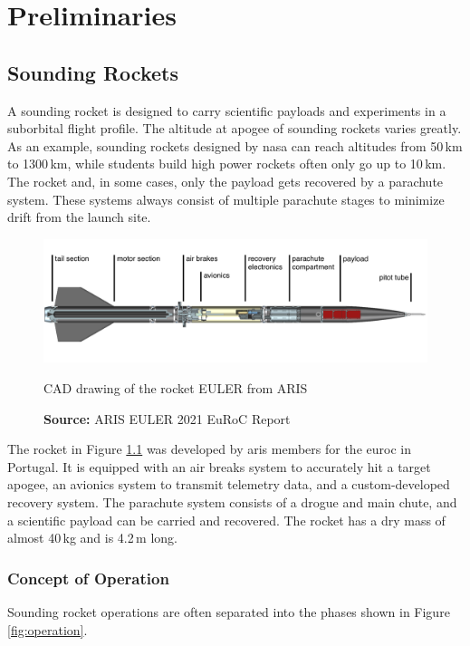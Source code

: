 \chapter{Preliminaries}

\section{Sounding Rockets}
A sounding rocket is designed to carry scientific payloads and experiments in a suborbital flight profile. The altitude at apogee of sounding rockets varies greatly. As an example, sounding rockets designed by \gls{nasa} can reach altitudes from 50\,km to 1300\,km, while students build high power rockets often only go up to 10\,km. The rocket and, in some cases, only the payload gets recovered by a parachute system. These systems always consist of multiple parachute stages to minimize drift from the launch site.\cite{nasa-rockets}

\begin{figure}[h!]
	\centering
	\includegraphics[width=\textwidth]{images/EULER_FSL_CAD}
	\caption{CAD drawing of the rocket EULER from ARIS}
	\caption*{\textbf{Source:} ARIS EULER 2021 EuRoC Report \cite{euler-euroc_report}}
	\label{fig:euler}
\end{figure}

The rocket in Figure \ref{fig:euler} was developed by \acrshort{aris} members for the \acrfull{euroc} in Portugal. It is equipped with an air breaks system to accurately hit a target apogee, an avionics system to transmit telemetry data, and a custom-developed recovery system. The parachute system consists of a drogue and main chute, and a scientific payload can be carried and recovered. The rocket has a dry mass of almost 40\,kg and is 4.2\,m long.  


\newpage

\subsection{Concept of Operation}\label{conops}
Sounding rocket operations are often separated into the phases shown in Figure \ref{fig:operation}.

